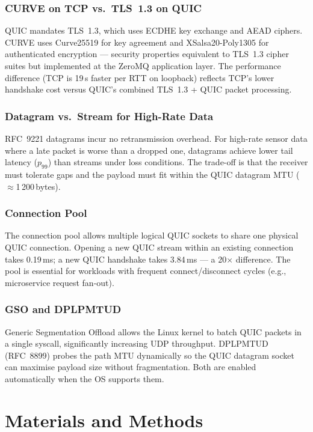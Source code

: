 \documentclass[12pt, a4paper, oneside]{report}
\begin{document}
\subsection{CURVE on TCP vs.\ TLS~1.3 on QUIC}
QUIC mandates TLS~1.3, which uses ECDHE key exchange and AEAD ciphers. CURVE uses Curve25519 for key agreement and XSalsa20-Poly1305 for authenticated encryption — security properties equivalent to TLS~1.3 cipher suites but implemented at the ZeroMQ application layer. The performance difference (TCP is 19\,\textmu s faster per RTT on loopback) reflects TCP's lower handshake cost versus QUIC's combined TLS~1.3 + QUIC packet processing.

\subsection{Datagram vs.\ Stream for High-Rate Data}
RFC~9221 datagrams incur no retransmission overhead. For high-rate sensor data where a late packet is worse than a dropped one, datagrams achieve lower tail latency ($p_{99}$) than streams under loss conditions. The trade-off is that the receiver must tolerate gaps and the payload must fit within the QUIC datagram MTU ($\approx$1\,200\,bytes).

\subsection{Connection Pool}
The connection pool allows multiple logical QUIC sockets to share one physical QUIC connection. Opening a new QUIC stream within an existing connection takes 0.19\,ms; a new QUIC handshake takes 3.84\,ms — a 20$\times$ difference. The pool is essential for workloads with frequent connect/disconnect cycles (e.g., microservice request fan-out).

\subsection{GSO and DPLPMTUD}
Generic Segmentation Offload allows the Linux kernel to batch QUIC packets in a single syscall, significantly increasing UDP throughput. DPLPMTUD (RFC~8899) probes the path MTU dynamically so the QUIC datagram socket can maximise payload size without fragmentation. Both are enabled automatically when the OS supports them.

\chapter{Materials and Methods}
\label{ch:materials}
\end{document}
